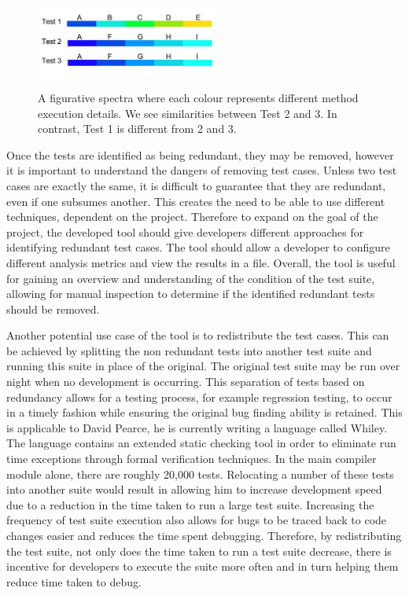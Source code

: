 \begin{figure}[h]
\centering
\includegraphics[width=6cm,height=3cm]{spectra.png}
\caption{A figurative spectra where each colour represents different method execution details. We see similarities between Test 2 and 3. In contrast, Test 1 is different from 2 and 3. }
\label{fig:spectra}
\end{figure}

Once the tests are identified as being redundant, they may be removed, however it is important to understand the dangers of removing test cases. Unless two test cases are exactly the same, it is difficult to guarantee that they are redundant, even if one subsumes another. This creates the need to be able to use different techniques, dependent on the project. Therefore to expand on the goal of the project, the developed tool should give developers different approaches for identifying redundant test cases. The tool should allow a developer to configure different analysis metrics and view the results in a file. Overall, the tool is useful for gaining an overview and understanding of the condition of the test suite, allowing for manual inspection to determine if the identified redundant tests should be removed.

Another potential use case of the tool is to redistribute the test cases. This can be achieved by splitting the non redundant tests into another test suite and running this suite in place of the original. The original test suite may be run over night when no development is occurring. This separation of tests based on redundancy allows for a testing process, for example regression testing, to occur in a timely fashion while ensuring the original bug finding ability is retained. This is applicable to David Pearce, he is currently writing a language called Whiley. The language contains an extended static checking tool in order to eliminate run time exceptions through formal verification techniques. In the main compiler module alone, there are roughly 20,000 tests. Relocating a number of these tests into another suite would result in allowing him to increase development speed due to a reduction in the time taken to run a large test suite. Increasing the frequency of test suite execution also allows for bugs to be traced back to code changes easier and reduces the time spent debugging. Therefore, by redistributing the test suite, not only does the time taken to run a test suite decrease, there is incentive for developers to execute the suite more often and in turn helping them reduce time taken to debug.

